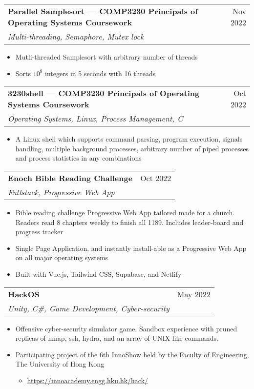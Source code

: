 \documentclass{article}
\newcommand{\jobTitle}[3]{
\vspace{0.4cm}
\begin{tabularx}{0.99\linewidth}{ X r }
    \textbf{#1} & #2\\
    \textit{#3} &
\end{tabularx}
\vspace{0.2cm}
}
\newenvironment{descitemize}
{ \begin{itemize}[leftmargin=1.4cm,,topsep=0pt]
    \setlength{\parskip}{0pt}
    \setlength{\parsep}{0pt}     }
{ \end{itemize}                  }
\begin{document}
\jobTitle
{Parallel Samplesort --- COMP3230 Principals of Operating Systems Coursework}
{Nov 2022}
{Multi-threading, Semaphore, Mutex lock}
\begin{descitemize}
    \item Mutli-threaded Samplesort with arbitrary number of threads
    \item Sorts $10^8$ integers in 5 seconds with 16 threads
\end{descitemize}

\jobTitle
{3230shell --- COMP3230 Principals of Operating Systems Coursework}
{Oct 2022}
{Operating Systems, Linux, Process Management, C}
\begin{descitemize}
    \item A Linux shell which supports command parsing, program execution, signals handling, multiple background processes, arbitrary number of piped processes and process statistics in any combinations
\end{descitemize}

\jobTitle
{Enoch Bible Reading Challenge}
{Oct 2022}
{Fullstack, Progressive Web App}
\begin{descitemize}
    \item Bible reading challenge Progressive Web App tailored made for a church. Readers read 8 chapters weekly to finish all 1189. Includes leader-board and progress tracker
	\item Single Page Application, and instantly install-able as a Progressive Web App on all major operating systems
    \item Built with Vue.js, Tailwind CSS, Supabase, and Netlify
\end{descitemize}

\jobTitle
{HackOS}
{May 2022}
{Unity, C\#, Game Development, Cyber-security}
\begin{descitemize}
    \item Offensive cyber-security simulator game. Sandbox experience with pruned replicas of nmap, ssh, hydra, and an array of UNIX-like commands.
    \item Participating project of the 6th InnoShow held by the Faculty of Engineering, The University of Hong Kong
    \begin{itemize}
        \item \href{https://innoacademy.engg.hku.hk/hack/}{https://innoacademy.engg.hku.hk/hack/}
    \end{itemize}
\end{descitemize}
\end{document}
